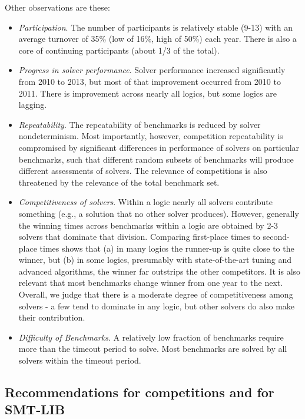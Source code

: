 \documentclass{eptcs}
\begin{document}
Other observations are these:
\begin{itemize}
\item {\em Participation}. The number of participants is relatively stable (9-13) with an average turnover of 35\% (low of 16\%, high of 50\%) each year. There is also a core of continuing participants (about 1/3 of the total).
\item {\em Progress in solver performance}. Solver performance increased significantly from 2010 to 2013, but most of that improvement occurred from 2010 to 2011. There is improvement across nearly all logics, but some logics are lagging.
\item {\em Repeatability}. The repeatability of benchmarks is reduced by solver nondeterminism. Most importantly, however, competition repeatability is compromised by significant differences in performance of solvers on particular benchmarks, such that different random subsets of benchmarks will produce different assessments of solvers. The relevance of competitions is also threatened by the relevance of the total benchmark set.
\item {\em Competitiveness of solvers}. Within a logic nearly all solvers contribute something (e.g., a solution that no other solver produces). However, generally the winning times across benchmarks within a logic are obtained by 2-3 solvers that dominate that division. Comparing first-place times to second-place times shows that (a) in many logics the runner-up is quite close to the winner, but (b) in some logics, presumably with state-of-the-art tuning and advanced algorithms, the winner far outstrips the other competitors. It is also relevant that most benchmarks change winner from one year to the next. Overall, we judge that there is a moderate degree of competitiveness among solvers - a few tend to dominate in any logic, but other solvers do also make their contribution.
\item {\em Difficulty of Benchmarks}. A relatively low fraction of benchmarks require more than the timeout period to solve. Most benchmarks are solved by all solvers within the timeout period.

\end{itemize}

\subsection{Recommendations for competitions and for SMT-LIB}
\end{document}
